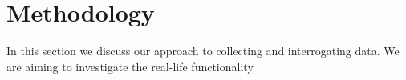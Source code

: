 \chapter{Methodology}

In this section we discuss our approach to collecting and interrogating data. 
We are aiming to investigate the real-life functionality 
